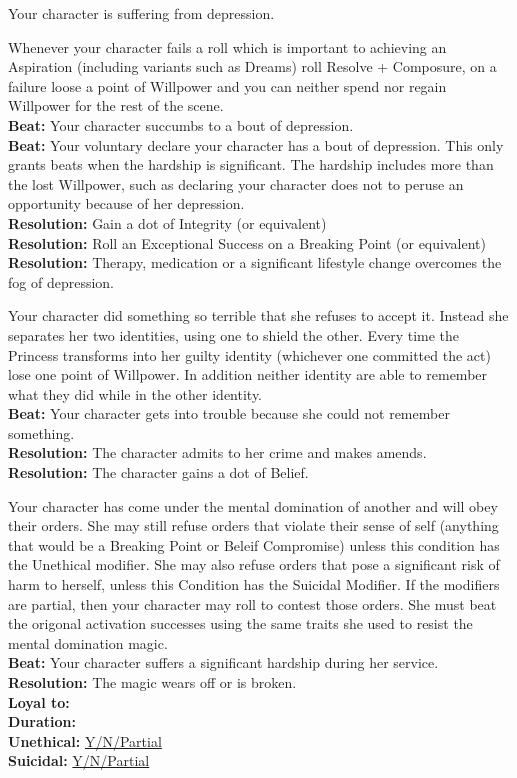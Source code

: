 \documentclass[10pt, frontgrid, backgrid]{flacards}
\begin{document}
{Your character is suffering from depression. 

Whenever your character fails a roll which is important to achieving an Aspiration (including variants such as Dreams) roll Resolve + Composure, on a failure loose a point of Willpower and you can neither spend nor regain Willpower for the rest of the scene. \\

\textbf{Beat:} Your character succumbs to a bout of depression. \\
\textbf{Beat:} Your voluntary declare your character has a bout of depression. This only grants beats when the hardship is significant. The hardship includes more than the lost Willpower, such as declaring your character does not to peruse an opportunity because of her depression.\\
\textbf{Resolution:} Gain a dot of Integrity (or equivalent)\\
\textbf{Resolution:} Roll an Exceptional Success on a Breaking Point (or equivalent)\\
\textbf{Resolution:} Therapy, medication or a significant lifestyle change overcomes the fog of depression. 
}

{Your character did something so terrible that she refuses to accept it. Instead she separates her two identities, using one to shield the other. Every time the Princess transforms into her guilty identity (whichever one committed the act) lose one point of Willpower. In addition neither identity are able to remember what they did while in the other identity.\\
\textbf{Beat:} Your character gets into trouble because she could not remember something. \\
\textbf{Resolution:} The character admits to her crime and makes amends.\\
\textbf{Resolution:} The character gains a dot of Belief.}

{Your character has come under the mental domination of another and will obey their orders. She may still refuse orders that violate their sense of self (anything that would be a Breaking Point or Beleif Compromise) unless this condition has the Unethical modifier. She may also refuse orders that pose a significant risk of harm to herself, unless this Condition has the Suicidal Modifier. If the modifiers are partial, then your character may roll to contest those orders. She must beat the origonal activation successes using the same traits she used to resist the mental domination magic.\\

\textbf{Beat:} Your character suffers a significant hardship during her service. \\
\textbf{Resolution:} The magic wears off or is broken.\\
\textbf{Loyal to:}\fillunderline\\
\textbf{Duration:}\fillunderline\\
\textbf{Unethical:} \underline{Y/N/Partial}\\
\textbf{Suicidal:} \underline{Y/N/Partial}}
\end{document}
